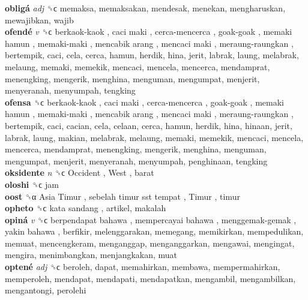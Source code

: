 \textbf{obligá} \emph{adj}  ␝ϲ  memaksa, memaksakan, mendesak, menekan, mengharuskan, mewajibkan, wajib  \\
\textbf{ofendé} \emph{v}  ␝ϲ   berkaok-kaok ,  caci maki ,  cerca-mencerca ,  goak-goak ,  memaki hamun ,  memaki-maki ,  mencabik arang ,  mencaci maki ,  meraung-raungkan , bertempik, caci, cela, cerca, hamun, herdik, hina, jerit, labrak, laung, melabrak, melaung, memaki, memekik, mencaci, mencela, mencerca, mendamprat, menengking, mengerik, menghina, menguman, mengumpat, menjerit, menyeranah, menyumpah, tengking  \\
\textbf{ofensa} ␝ϲ   berkaok-kaok ,  caci maki ,  cerca-mencerca ,  goak-goak ,  memaki hamun ,  memaki-maki ,  mencabik arang ,  mencaci maki ,  meraung-raungkan , bertempik, caci, cacian, cela, celaan, cerca, hamun, herdik, hina, hinaan, jerit, labrak, laung, makian, melabrak, melaung, memaki, memekik, mencaci, mencela, mencerca, mendamprat, menengking, mengerik, menghina, menguman, mengumpat, menjerit, menyeranah, menyumpah, penghinaan, tengking  \\
\textbf{oksidente} \emph{n}  ␝ϲ   Occident ,  West , barat  \\
\textbf{oloshi} ␝ϲ  jam  \\
\textbf{oost} ␝α   Asia Timur ,  sebelah timur sst tempat ,  Timur , timur  \\
\textbf{opheto} ␝ϲ   kata sandang , artikel, makalah  \\
\textbf{opiná} \emph{v}  ␝ϲ   berpendapat bahawa ,  mempercayai bahawa ,  menggemak-gemak ,  yakin bahawa , berfikir, melenggarakan, memegang, memikirkan, mempedulikan, memuat, mencengkeram, menganggap, menganggarkan, mengawai, mengingat, mengira, menimbangkan, menjangkakan, muat  \\
\textbf{optené} \emph{adj}  ␝ϲ  beroleh, dapat, memahirkan, membawa, mempermahirkan, memperoleh, mendapat, mendapati, mendapatkan, mengambil, mengambilkan, mengantongi, perolehi  \\
